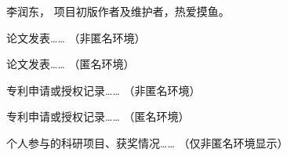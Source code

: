\documentclass[doctor]{shtthesis}
\makeatletter
\def\ifgraduate{\ifsht@graduate}
\makeatother
\begin{document}
\maketitle

\frontmatter


\makeindices

\ifgraduate

\fi

\mainmatter


\backmatter


\ifgraduate
\begin{resume}
  李润东，\shtthesis{} 项目初版作者及维护者，热爱摸鱼。
\end{resume}

\begin{publications}
  论文发表…… （非匿名环境）
\end{publications}

\begin{publications*}
  论文发表…… （匿名环境）
\end{publications*}

\begin{patents}
  专利申请或授权记录…… （非匿名环境）
\end{patents}

\begin{patents*}
  专利申请或授权记录…… （匿名环境）
\end{patents*}

\begin{projects}
  个人参与的科研项目、获奖情况…… （仅非匿名环境显示）
\end{projects}
\fi
\end{document}
